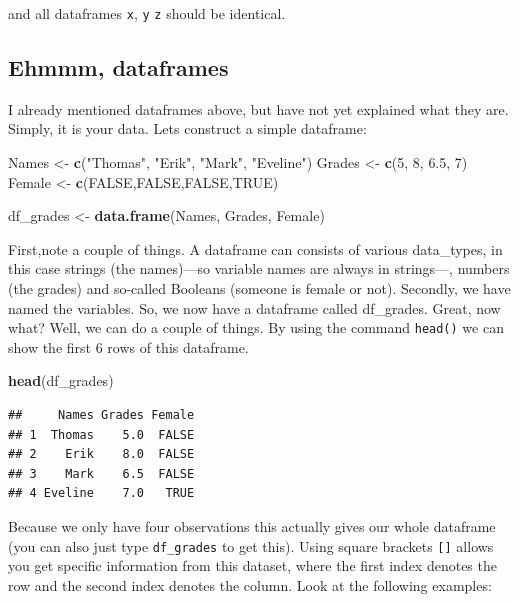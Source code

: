 \documentclass[]{article}
\newenvironment{Shaded}{\begin{snugshade}}{\end{snugshade}}
\newcommand{\KeywordTok}[1]{\textcolor[rgb]{0.13,0.29,0.53}{\textbf{#1}}}
\newcommand{\DecValTok}[1]{\textcolor[rgb]{0.00,0.00,0.81}{#1}}
\newcommand{\FloatTok}[1]{\textcolor[rgb]{0.00,0.00,0.81}{#1}}
\newcommand{\StringTok}[1]{\textcolor[rgb]{0.31,0.60,0.02}{#1}}
\newcommand{\OtherTok}[1]{\textcolor[rgb]{0.56,0.35,0.01}{#1}}
\newcommand{\NormalTok}[1]{#1}
\theoremstyle{definition}
\theoremstyle{definition}
\theoremstyle{definition}
\theoremstyle{remark}
\begin{document}
and all dataframes \texttt{x}, \texttt{y} \texttt{z} should be
identical.

\subsection{Ehmmm, dataframes}\label{ehmmm-dataframes}

I already mentioned dataframes above, but have not yet explained what
they are. Simply, it is your data. Lets construct a simple dataframe:

\begin{Shaded}
\begin{Highlighting}[]
\NormalTok{Names  <-}\StringTok{ }\KeywordTok{c}\NormalTok{(}\StringTok{"Thomas"}\NormalTok{, }\StringTok{"Erik"}\NormalTok{, }\StringTok{"Mark"}\NormalTok{, }\StringTok{"Eveline"}\NormalTok{)}
\NormalTok{Grades <-}\StringTok{ }\KeywordTok{c}\NormalTok{(}\DecValTok{5}\NormalTok{, }\DecValTok{8}\NormalTok{, }\FloatTok{6.5}\NormalTok{, }\DecValTok{7}\NormalTok{)}
\NormalTok{Female <-}\StringTok{ }\KeywordTok{c}\NormalTok{(}\OtherTok{FALSE}\NormalTok{,}\OtherTok{FALSE}\NormalTok{,}\OtherTok{FALSE}\NormalTok{,}\OtherTok{TRUE}\NormalTok{)}

\NormalTok{df_grades <-}\StringTok{ }\KeywordTok{data.frame}\NormalTok{(Names, Grades, Female) }
\end{Highlighting}
\end{Shaded}

First,note a couple of things. A dataframe can consists of various
data\_types, in this case strings (the names)---so variable names are
always in strings---, numbers (the grades) and so-called Booleans
(someone is female or not). Secondly, we have named the variables. So,
we now have a dataframe called df\_grades. Great, now what? Well, we can
do a couple of things. By using the command \texttt{head()} we can show
the first 6 rows of this dataframe.

\begin{Shaded}
\begin{Highlighting}[]
\KeywordTok{head}\NormalTok{(df_grades)}
\end{Highlighting}
\end{Shaded}

\begin{verbatim}
##     Names Grades Female
## 1  Thomas    5.0  FALSE
## 2    Erik    8.0  FALSE
## 3    Mark    6.5  FALSE
## 4 Eveline    7.0   TRUE
\end{verbatim}

Because we only have four observations this actually gives our whole
dataframe (you can also just type \texttt{df\_grades} to get this).
Using square brackets \texttt{{[}{]}} allows you get specific
information from this dataset, where the first index denotes the row and
the second index denotes the column. Look at the following examples:
\end{document}
